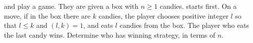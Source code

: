  and  play a game. They are given a box with $n\ge1$ candies.  starts first. On a move, if in the box there are $k$ candies, the player chooses positive integer $l$ so that $l \le k$ and $(l, k) = 1$,  and eats $l$ candies from the box. The player who eats the last candy wins. Determine who has winning strategy, in terms of $n$.
